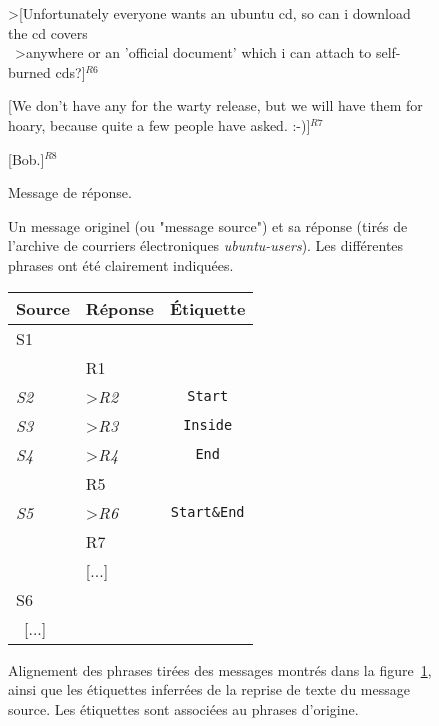 \begin{figure}
\begin{minipage}{\textwidth}
{{                \textgreater [Unfortunately everyone wants an ubuntu cd, so can i download the cd covers \\ \ 
                \textgreater anywhere or an 'official document' which i can attach to self-burned cds?]$^{R6}$\vspace{0.3cm}

                [We don't have any for the warty release, but we will have them for hoary, %
                because quite a few people have asked. :-)]$^{R7}$\vspace{0.3cm}

                [Bob.]$^{R8}$ %
                \vspace{3mm}
            }
        }
        
        \begin{center}
        Message de réponse.
        \end{center}
    \end{minipage}

    \caption{Un message originel (ou "message source") et sa réponse (tirés de l'archive de courriers électroniques \textit{ubuntu-users}). Les différentes phrases ont été clairement indiquées.}
    \label{fig:exampleSourceReplyMessage}
\end{figure}

\begin{figure}
    \begin{minipage}{\textwidth}
        \small\centering
        \begin{tabular}{*{2}{|l}|c|}
        \hline
        \textbf{Source} & \textbf{Réponse} & \textbf{Étiquette}\\
            \hline
            S1  & & \\
            & R1 & \\
            \textit{S2}  & \textgreater \textit{R2}& \texttt{Start}\\
            \textit{S3}  & \textgreater \textit{R3}& \texttt{Inside}\\
            \textit{S4}  & \textgreater \textit{R4}& \texttt{End}\\
            & R5 & \\
            \textit{S5}  & \textgreater \textit{R6} & \texttt{Start\&End}\\
            & R7 & \\
            & [...] & \\
            S6 &  & \\ \ 
            [...] &  & \\
            \hline
        \end{tabular}
    \end{minipage}

    \caption{Alignement des phrases tirées des messages montrés dans la figure~\ref{fig:exampleSourceReplyMessage}, ainsi que les étiquettes inferrées de la reprise de texte du message source. Les étiquettes sont associées au phrases d'origine.}
    \label{fig:exampleSegmentationLabels}
\end{figure}
